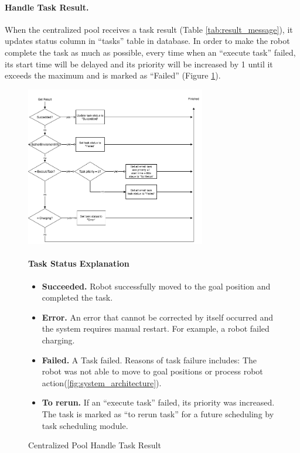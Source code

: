 \paragraph{Handle Task Result.}
When the centralized pool receives a task result (Table \ref{tab:result_message}), it updates status column in ``tasks'' table in database. 
In order to make the robot complete the task as much as possible, every time when an ``execute task'' failed, its start time will be delayed and its priority will be increased by 1 until it exceeds the maximum and is marked as ``Failed'' 
(Figure \ref{fig:centralized_task_handle}).


\begin{figure}[htbp]
    \centering
    \includegraphics[width = 0.7\textwidth]{content/images/ch4/centralized_task_result.drawio.png}
    \caption{Centralized Pool Handle Task Result}
    \label{fig:centralized_task_handle}
    \paragraph{Task Status Explanation}
    \begin{itemize}     
        \item \textbf{Succeeded.} Robot successfully moved to the goal position and completed the task.
        \item \textbf{Error.} An error that cannot be corrected by itself occurred and the system requires manual restart. For example, a robot failed charging.
        \item \textbf{Failed.} A Task failed. Reasons of task failure includes: The robot was not able to move to goal positions or process robot action(\ref{fig:system_architecture}). 
        \item \textbf{To rerun.} If an ``execute task'' failed, its priority was increased. The task is marked as ``to rerun task''  for a future scheduling by task scheduling module.
    \end{itemize}   
\end{figure}


